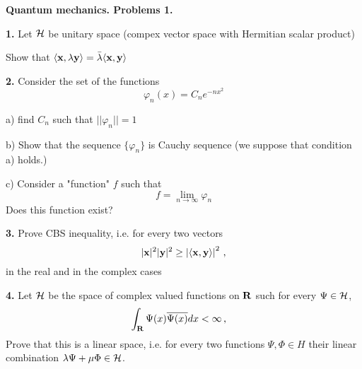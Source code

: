 \baselineskip=14pt
\def\vare {\varepsilon}
\def\A {{\bf A}}
\def\t {\tilde}
\def\a {\alpha}
\def\K {{\bf K}}
\def\N {{\bf N}}
\def\V {{\cal V}}
\def\s {{\sigma}}
\def\S {{\Sigma}}
\def\s {{\sigma}}
\def\p{\partial}
\def\vare{{\varepsilon}}
\def\Q {{\bf Q}}
\def\D {{\cal D}}
\def\G {{\Gamma}}
\def\C {{\bf C}}
\def\M {{\cal M}}
\def\Z {{\bf Z}}
\def\U  {{\cal U}}
\def\H {{\cal H}}
\def\R  {{\bf R}}
\def\S  {{\bf S}}
\def\E  {{\bf E}}
\def\l {\lambda}
\def\ll {{\bf l}}
\def\degree {{\bf {\rm degree}\,\,}}
\def \finish {${\,\,\vrule height1mm depth2mm width 8pt}$}
\def \m {\medskip}
\def\p {\partial}
\def\r {{\bf r}}
\def\pt {{\bf p}}
\def\v {{\bf v}}
\def\n {{\bf n}}
\def\t {{\bf t}}
\def\b {{\bf b}}
\def\c {{\bf c }}
\def\e{{\bf e}}
\def\ac {{\bf a}}
\def \X   {{\bf X}}
\def \Y   {{\bf Y}}
\def \x   {{\bf x}}
\def \y   {{\bf y}}
\def \z   {{\bf z}}
\def \G{{\cal G}}
\def\w {{\omega}}
\def \Tr  {{\rm Tr\,}}
\def\V {{\cal V}}


\centerline {\bf Quantum mechanics. Problems 1.}


{\bf 1.}    Let $\cal H$ be unitary space (compex vector space with 
Hermitian scalar product)


   Show that
    $\langle \x,\lambda \y\rangle=\bar\lambda\langle\x,\y\rangle$

   
\m


{\bf 2.}   Consider the set of the functions
                  $$
      \varphi_n(x)=C_n e^{-nx^2}
                  $$       

 a) find  $C_n$  such that  $||\varphi_n||=1$ 
                      
 b) Show that the sequence $\{\varphi_n\}$ is Cauchy sequence
  (we suppose that condition a) holds.)

      

 c)     Consider a  "function" $f$ such that
                $$
   f=\lim_{n\to \infty}\varphi_n
                $$
Does this function exist?
  

\m



{\bf 3.}   Prove  CBS inequality, i.e. for every two vectors
                 $$
|\x|^2|\y|^2\geq \left|\langle\x, \y\rangle\right|^2\,,
               $$
             in the real and in the complex cases

{\bf 4.}   
Let $\cal H$ be the space of 
complex valued functions on $\R$ such  for every $\Psi\in \cal H$,
       $$
\int_\R \Psi (x) \overline{ \Psi (x)}dx <\infty\,,\quad
       $$ 
Prove that this is a linear space, i.e. for every two functions
$\Psi,\Phi\in H$ their linear combination $\lambda\Psi+\mu\Phi\in \cal H$.
     

